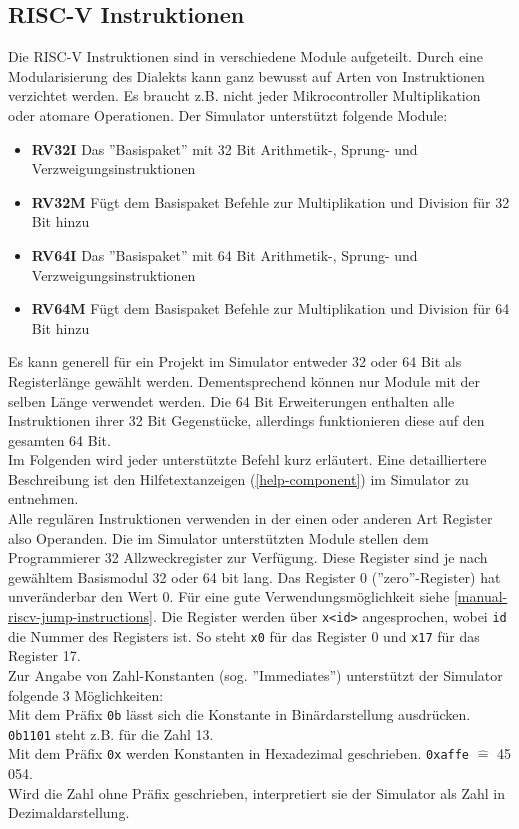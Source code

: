 \subsection{RISC-V Instruktionen}
Die RISC-V Instruktionen sind in verschiedene Module aufgeteilt. Durch eine Modularisierung des Dialekts kann ganz bewusst auf Arten von Instruktionen verzichtet werden. Es braucht z.B. nicht jeder Mikrocontroller Multiplikation oder atomare Operationen. Der Simulator unterstützt folgende Module:\\
\begin{itemize}
	\item \textbf{RV32I} Das ''Basispaket'' mit 32 Bit Arithmetik-, Sprung- und Verzweigungsinstruktionen
	\item\textbf{ RV32M} Fügt dem Basispaket Befehle zur Multiplikation und Division für 32 Bit hinzu
	\item \textbf{RV64I} Das ''Basispaket'' mit 64 Bit Arithmetik-, Sprung- und Verzweigungsinstruktionen
	\item \textbf{RV64M} Fügt dem Basispaket Befehle zur Multiplikation und Division für 64 Bit hinzu
\end{itemize}
Es kann generell für ein Projekt im Simulator entweder 32 oder 64 Bit als Registerlänge gewählt werden. Dementsprechend können nur Module mit der selben Länge verwendet werden. Die 64 Bit Erweiterungen enthalten alle Instruktionen ihrer 32 Bit Gegenstücke, allerdings funktionieren diese auf den gesamten 64 Bit.\\
Im Folgenden wird jeder unterstützte Befehl kurz erläutert. Eine detailliertere Beschreibung ist den Hilfetextanzeigen (\autoref{help-component}) im Simulator zu entnehmen.\\

Alle regulären Instruktionen verwenden in der einen oder anderen Art Register also Operanden. Die im Simulator unterstützten Module stellen dem Programmierer 32 Allzweckregister zur Verfügung. Diese Register sind je nach gewähltem Basismodul 32 oder 64 bit lang. Das Register 0 (''zero''-Register) hat unveränderbar den Wert 0. Für eine gute Verwendungsmöglichkeit siehe \autoref{manual-riscv-jump-instructions}. Die Register werden über \texttt{x<id>} angesprochen, wobei \texttt{id} die Nummer des Registers ist. So steht \texttt{x0} für das Register 0 und \texttt{x17} für das Register 17.\\
Zur Angabe von Zahl-Konstanten (sog. ''Immediates'') unterstützt der Simulator folgende 3 Möglichkeiten:\\
Mit dem Präfix \texttt{0b} lässt sich die Konstante in Binärdarstellung ausdrücken. \texttt{0b1101} steht z.B. für die Zahl 13.\\
Mit dem Präfix \texttt{0x} werden Konstanten in Hexadezimal geschrieben. \texttt{0xaffe} $\widehat{=}$ 45 054.\\
Wird die Zahl ohne Präfix geschrieben, interpretiert sie der Simulator als Zahl in Dezimaldarstellung.

